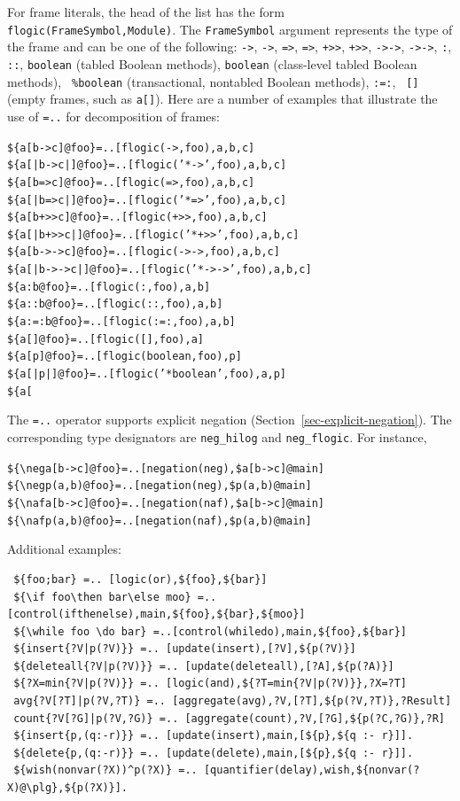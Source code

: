 \documentclass[11pt]{article}
\newcommand{\bs}{\textbackslash}
\newcommand{\RULELOGNAF}{{\texttt{{\bs}naf}}\xspace}
\newcommand{\RULELOGNEG}{{\texttt{{\bs}neg}}\xspace}
\begin{document}
For frame literals, the head of the list has the form
{\tt flogic(FrameSymbol,Module)}. The {\tt FrameSymbol} argument
represents the type of the frame and can be one of the following:
{\tt ->}, {\tt *->}, {\tt =>}, {\tt *=>}, {\tt +>{}>}, {\tt *+>{}>}, {\tt ->->},
{\tt *->->}, {\tt :}, {\tt ::}, {\tt boolean} (tabled Boolean methods),
{\tt *boolean} (class-level tabled Boolean methods), {\tt 
  \%boolean} (transactional, nontabled Boolean methods), {\tt :=:}, {\tt
  []} (empty frames, such as {\tt a[]}). Here are a number of examples
that illustrate the use of {\tt =..} for decomposition of frames:
\begin{alltt}
    \$\{a[b->c]@foo\} =.. [flogic(->,foo), a, b, c]
    \$\{a[|b->c|]@foo\} =.. [flogic('*->',foo), a, b, c]
    \$\{a[b=>c]@foo\} =.. [flogic(=>,foo), a, b, c]
    \$\{a[|b=>c|]@foo\} =.. [flogic('*=>',foo), a, b, c]
    \$\{a[b+>{}>c]@foo\} =.. [flogic(+>{}>,foo), a, b, c]
    \$\{a[|b+>{}>c|]@foo\} =.. [flogic('*+>{}>',foo), a, b, c]
    \$\{a[b->->c]@foo\} =.. [flogic(->->,foo), a, b, c]
    \$\{a[|b->->c|]@foo\} =.. [flogic('*->->',foo), a, b, c]
    \$\{a:b@foo\} =.. [flogic(:,foo), a, b]
    \$\{a::b@foo\} =.. [flogic(::,foo), a, b]
    \$\{a:=:b@foo\} =.. [flogic(:=:,foo), a, b]
    \$\{a[]@foo\} =.. [flogic([],foo), a]
    \$\{a[p]@foo\} =.. [flogic(boolean,foo), p]
    \$\{a[|p|]@foo\} =.. [flogic('*boolean',foo), a, p]
    \$\{a[%
\end{alltt}
The {\tt =..} operator supports explicit negation
(Section~\ref{sec-explicit-negation}). The corresponding 
type designators are {\tt neg\_hilog} and {\tt neg\_flogic}. For instance,
\begin{alltt}
     \$\{\RULELOGNEG a[b->c]@foo\} =.. [negation(neg), \${a[b->c]@main}]
     \$\{\RULELOGNEG p(a,b)@foo\} =.. [negation(neg), \${p(a,b)@main}]
     \$\{\RULELOGNAF a[b->c]@foo\} =.. [negation(naf), \${a[b->c]@main}]
     \$\{\RULELOGNAF p(a,b)@foo\} =.. [negation(naf), \${p(a,b)@main}]
\end{alltt}

Additional examples:
\begin{verbatim}
 ${foo;bar} =.. [logic(or),${foo},${bar}]
 ${\if foo\then bar\else moo} =.. [control(ifthenelse),main,${foo},${bar},${moo}]
 ${\while foo \do bar} =..[control(whiledo),main,${foo},${bar}]
 ${insert{?V|p(?V)}} =.. [update(insert),[?V],${p(?V)}]
 ${deleteall{?V|p(?V)}} =.. [update(deleteall),[?A],${p(?A)}]
 ${?X=min{?V|p(?V)}} =.. [logic(and),${?T=min{?V|p(?V)}},?X=?T]
 avg{?V[?T]|p(?V,?T)} =.. [aggregate(avg),?V,[?T],${p(?V,?T)},?Result]
 count{?V[?G]|p(?V,?G)} =.. [aggregate(count),?V,[?G],${p(?C,?G)},?R]
 ${insert{p,(q:-r)}} =.. [update(insert),main,[${p},${q :- r}]].
 ${delete{p,(q:-r)}} =.. [update(delete),main,[${p},${q :- r}]].
 ${wish(nonvar(?X))^p(?X)} =.. [quantifier(delay),wish,${nonvar(?X)@\plg},${p(?X)}].
\end{verbatim}
\end{document}

